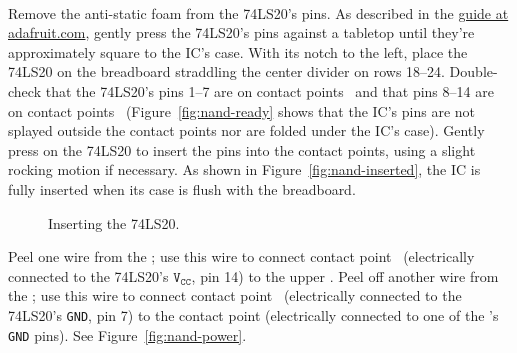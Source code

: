 \disconnect\


Remove the anti-static foam from the 74LS20's pins.
As described in the \href{https://learn.adafruit.com/breadboards-for-beginners/breadboard-usage}{guide at adafruit.com}, gently press the 74LS20's pins against a tabletop until they're approximately square to the IC's case.
With its notch to the left, place the 74LS20 on the breadboard straddling the center divider on rows 18--24.
Double-check that the 74LS20's pins 1--7 are on contact points \nandlowerrow\ and that pins 8--14 are on contact points \nandupperrow\ (Figure~\ref{fig:nand-ready} shows that the IC's pins are not splayed outside the contact points nor are folded under the IC's case).
Gently press on the 74LS20 to insert the pins into the contact points, using a slight rocking motion if necessary.
As shown in Figure~\ref{fig:nand-inserted}, the IC is fully inserted when its case is flush with the breadboard.

\begin{figure}
    \centering
    \hfil
    \caption{Inserting the 74LS20.}
\end{figure}

Peel one wire from the \rainbow;
use this wire to connect contact point \nandvcc\ (electrically connected to the 74LS20's $\mathtt{V_{CC}}$, pin 14) to the upper \power.
Peel off another wire from the \rainbow;
use this wire to connect contact point \nandground\ (electrically connected to the 74LS20's \texttt{GND}, pin 7) to the contact point \mculowergroundcontactpoint (electrically connected to one of the \developmentboard's \texttt{GND} pins).
See Figure~\ref{fig:nand-power}.

